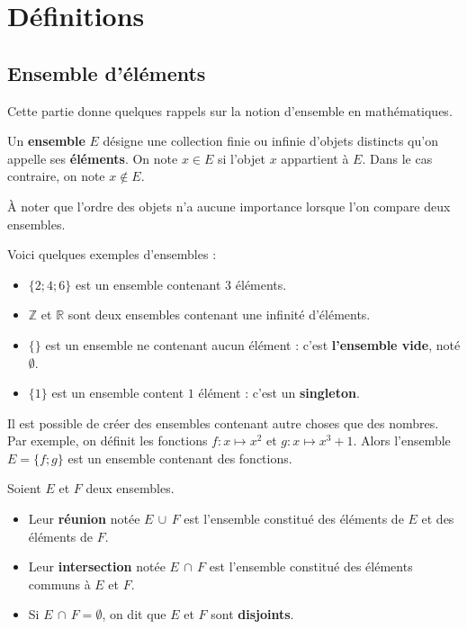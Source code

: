 


	
	\section{Définitions}
	
	\subsection{Ensemble d'éléments}
	
	Cette partie donne quelques rappels sur la notion d'ensemble en mathématiques.
	
	\begin{formula}[Définition]
		Un \textbf{ensemble} $E$ désigne une collection finie ou infinie d'objets distincts qu'on appelle ses \textbf{éléments}.
		\newpar
		On note $x \in E$ si l'objet $x$ appartient à $E$. Dans le cas contraire, on note $x \notin E$.
	\end{formula}
	
	À noter que l'ordre des objets n'a aucune importance lorsque l'on compare deux ensembles.
	
	\begin{tip}[Exemple]
		Voici quelques exemples d'ensembles :
		\begin{itemize}
			\item $\{2; 4; 6\}$ est un ensemble contenant $3$ éléments.
			\item $\mathbb{Z}$ et $\mathbb{R}$ sont deux ensembles contenant une infinité d'éléments.
			\item $\{\}$ est un ensemble ne contenant aucun élément : c'est \textbf{l'ensemble vide}, noté $\emptyset$.
			\item $\{1\}$ est un ensemble content $1$ élément : c'est un \textbf{singleton}.
		\end{itemize}
	\end{tip}
	
	\begin{tip}
		Il est possible de créer des ensembles contenant autre choses que des nombres. Par exemple, on définit les fonctions $f : x \mapsto x^2$ et $g : x \mapsto x^3 + 1$. Alors l'ensemble $E = \{f; g\}$ est un ensemble contenant des fonctions.
	\end{tip}
	
	\begin{formula}
		Soient $E$ et $F$ deux ensembles.
		\begin{itemize}
			\item Leur \textbf{réunion} notée $E \, \cup \, F$ est l'ensemble constitué des éléments de $E$ et des éléments de $F$.
			\item Leur \textbf{intersection} notée $E \, \cap \, F$ est l'ensemble constitué des éléments communs à $E$ et $F$.
			\item Si $E \, \cap \, F = \emptyset$, on dit que $E$ et $F$ sont \textbf{disjoints}.
		\end{itemize}
	\end{formula}
	
